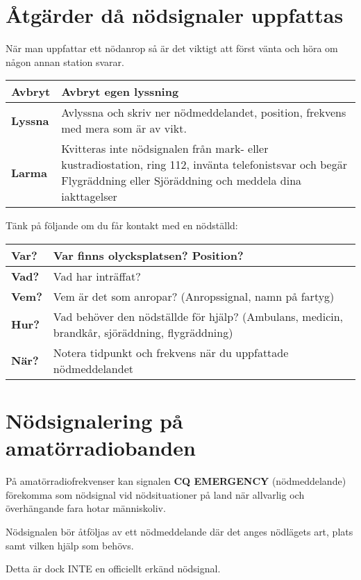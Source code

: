 \section{Åtgärder då nödsignaler uppfattas}

När man uppfattar ett nödanrop så är det viktigt att först vänta och
höra om någon annan station svarar.

\begin{tabularx}{\columnwidth}{lX}
  \textbf{Avbryt} & Avbryt egen lyssning \\\hline
  \textbf{Lyssna} & Avlyssna och skriv ner nödmeddelandet, position,
  frekvens med mera som är av vikt. \\\hline
  \textbf{Larma} & Kvitteras inte nödsignalen från mark- eller
  kustradiostation, ring 112, invänta telefonistsvar och begär
  Flygräddning eller Sjöräddning och meddela dina iakttagelser\\\hline
\end{tabularx}

Tänk på följande om du får kontakt med en nödställd:

\begin{tabularx}{\columnwidth}{lX}
  \textbf{Var?} & Var finns olycksplatsen? Position? \\ \hline
  \textbf{Vad?} & Vad har inträffat? \\ \hline
  \textbf{Vem?} & Vem är det som anropar? (Anropssignal, namn på
  fartyg) \\ \hline
  \textbf{Hur?} & Vad behöver den nödställde för hjälp? (Ambulans,
  medicin, brandkår, sjöräddning, flygräddning)\\ \hline
  \textbf{När?} & Notera tidpunkt och frekvens när du uppfattade
  nödmeddelandet\\ 
\end{tabularx}

\section{Nödsignalering på amatörradiobanden}

På amatörradiofrekvenser kan signalen \textbf{CQ EMERGENCY}
(nödmeddelande) förekomma som nödsignal vid nödsituationer på land när
allvarlig och överhängande fara hotar människoliv.

Nödsignalen bör åtföljas av ett nödmeddelande där det anges nödlägets
art, plats samt vilken hjälp som behövs.

Detta är dock INTE en officiellt erkänd nödsignal.

